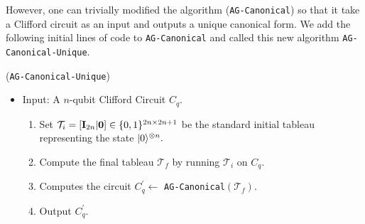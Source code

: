 However, one can trivially modified the algorithm ({\tt AG-Canonical}) \cite{AG04} so that it take a Clifford circuit as an input and outputs a unique canonical form. We add the following initial lines of code to {\tt AG-Canonical} and called this new algorithm {\tt AG-Canonical-Unique}.






\begin{framed}
\begin{flushleft}
({\tt AG-Canonical-Unique})
\begin{itemize}
\item[] Input: A $n$-qubit Clifford Circuit $C_q.$
\begin{enumerate}
\item Set $\mathcal{T}_i=[{\bf I}_{2n}|{\bf 0}]\in \{0,1\}^{2n \times 2n+1}$ be the standard  initial tableau  representing the state ${\lvert}0\rangle^{\otimes n}.$
\item Compute the final tableau $\mathcal{T}_f$ by running $\mathcal{T}_i$ on $C_q.$
\item Computes  the circuit $C_q^\prime \leftarrow$ {\tt AG-Canonical}$(\mathcal{T}_f).$
\item Output $C_q^\prime.$
\end{enumerate}
\end{itemize}
\end{flushleft}
\end{framed}


